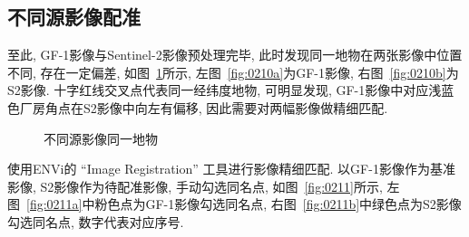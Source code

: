 \subsection{不同源影像配准}
至此, GF-1影像与Sentinel-2影像预处理完毕, 此时发现同一地物在两张影像中位置不同, 存在一定偏差, 如图~\ref{fig:0210}所示, 左图~\ref{fig:0210a}为GF-1影像, 右图~\ref{fig:0210b}为S2影像. 十字红线交叉点代表同一经纬度地物, 可明显发现, GF-1影像中对应浅蓝色厂房角点在S2影像中向左有偏移, 因此需要对两幅影像做精细匹配.

\begin{figure}[!htbp]
    \centering
    \qquad
    \caption{不同源影像同一地物}
    \label{fig:0210}
\end{figure}

使用ENVi的 ``Image Registration'' 工具进行影像精细匹配. 以GF-1影像作为基准影像, S2影像作为待配准影像, 手动勾选同名点, 如图~\ref{fig:0211}所示, 左图~\ref{fig:0211a}中粉色点为GF-1影像勾选同名点, 右图~\ref{fig:0211b}中绿色点为S2影像勾选同名点, 数字代表对应序号.

